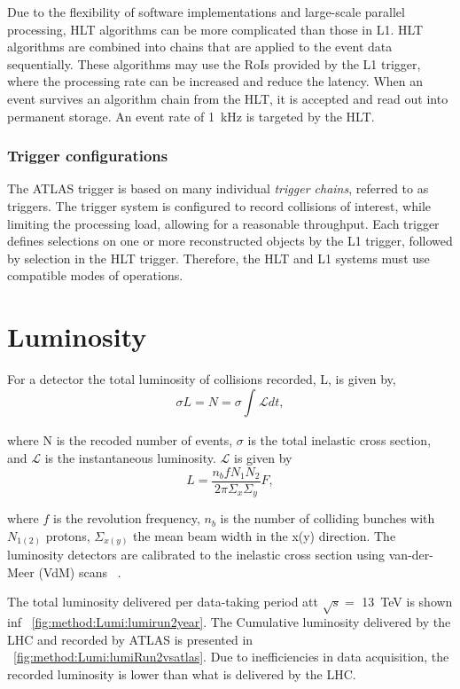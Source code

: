 Due to the flexibility of software implementations and large-scale parallel processing, HLT algorithms can be more complicated than those in L1. HLT algorithms are combined into chains that are applied to the event data sequentially. These algorithms may use the RoIs provided by the L1 trigger, where the processing rate can be increased and reduce the latency. When an event survives an algorithm chain from the HLT, it is accepted and read out into permanent storage. An event rate of \SI{1}{\kilo\hertz} is targeted by the HLT.

\subsubsection{Trigger configurations}

The ATLAS trigger is based on many individual \emph{trigger chains}, referred to as triggers. The trigger system is configured to record collisions of interest, while limiting the processing load, allowing for a reasonable throughput. Each trigger defines selections on one or more reconstructed objects by the L1 trigger, followed by selection in the HLT trigger. Therefore, the HLT and L1 systems must use compatible modes of operations.

\section{Luminosity}\label{sec:method:lumi}

For a detector the total luminosity of collisions recorded, L, is given by, 
\begin{equation}
   \sigma L = N = \sigma \int_{}^{} \mathcal{L} dt,
\end{equation}

where N is the recoded number of events, $\sigma$ is the total inelastic cross section, and $\mathcal{L}$ is the instantaneous luminosity. $\mathcal{L}$ is given by~\cite{Herr}
\begin{equation}
    L = \frac{n_b f N_1 N_2 }{2\pi \Sigma_{x} \Sigma_{y}} F,
\end{equation}

where $f$ is the revolution frequency, $n_b$ is the number of colliding bunches with $N_{1(2)}$ protons, $\Sigma_{x(y)}$ the mean beam width in the x(y) direction. The luminosity detectors are calibrated to the inelastic cross section using van-der-Meer (VdM) scans ~\cite{ATLAS:Balagura_2011,ATLAS:vanderMeer:296752}.

The total luminosity delivered per data-taking period att $\sqrt{s} = $ \SI{13}{\tera\electronvolt} is shown inf ~\cref{fig:method:Lumi:lumirun2year}. The Cumulative luminosity delivered by the LHC and recorded by ATLAS is presented in ~\cref{fig:method:Lumi:lumiRun2vsatlas}. Due to inefficiencies in data acquisition, the recorded luminosity is lower than what is delivered by the LHC.

